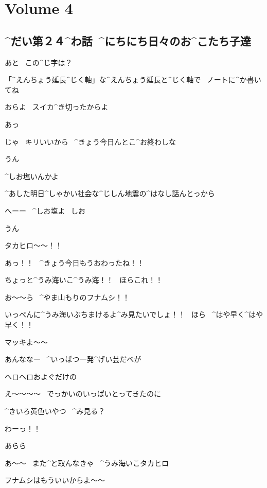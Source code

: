 \section{Volume 4}

\subsection{^{だい}{第}２４^{わ}{話}\ ^{にちにち}{日々}のお^{こたち}{子達}}

\page[4]
\Takahiro あと
\ この^{じ}{字}は？

\Person 「^{えんちょう}{延長}^{じく}{軸}」な^{えんちょう}{延長}と^{じく}{軸}で
\ ノートに^{か}{書}いてね

\Person おらよ
\ スイカ^{き}{切}ったからよ

\Takahiro あっ

\page[5]
\Person じゃ
\ キリいいから
\ ^{きょう}{今日}んとこ^{お}{終}わしな

\Takahiro うん

\Person ^{しお}{塩}いんかよ

\Person ^{あした}{明日}^{しゃかい}{社会}な^{じしん}{地震}の^{はなし}{話}んとっから

\Person へーー
\ ^{しお}{塩}よ
\ しお

\Takahiro うん

\page[6]
\Makki タカヒロ〜〜！！

\Makki あっ！！
\ ^{きょう}{今日}もうおわったね！！

\Makki ちょっと^{うみ}{海}いこ^{うみ}{海}！！
\ ほらこれ！！

\page[7]
\Makki お〜〜ら
\ ^{やま}{山}もりのフナムシ！！

\Makki いっぺんに^{うみ}{海}いぶちまけるよ^{み}{見}たいでしょ！！
\ ほら
\ ^{はや}{早}く^{はや}{早}く！！

\Takahiro マッキよ〜〜

\Takahiro あんななー
\ ^{いっぱつ}{一発}^{げい}{芸}だべが

\Takahiro ヘロヘロおよぐだけの

\Makki え〜〜〜〜
\ でっかいのいっぱいとってきたのに

\Makki ^{きいろ}{黄色}いやつ
\ ^{み}{見}る？

\page[8]
\Takahiro わーっ！！

\Makki あらら

\page[9]
\Makki あ〜〜
\ また^{と}{取}んなきゃ
\ ^{うみ}{海}いこタカヒロ

\Takahiro フナムシはもういいからよ〜〜

